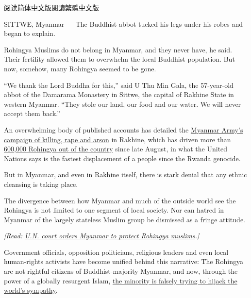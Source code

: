 \href{https://cn.nytimes3xbfgragh.onion/asia-pacific/20171025/myanmar-rohingya-ethnic-cleansing/}{阅读简体中文版}\href{https://cn.nytimes3xbfgragh.onion/asia-pacific/20171025/myanmar-rohingya-ethnic-cleansing/zh-hant/}{閱讀繁體中文版}

SITTWE, Myanmar --- The Buddhist abbot tucked his legs under his robes
and began to explain.

Rohingya Muslims do not belong in Myanmar, and they never have, he said.
Their fertility allowed them to overwhelm the local Buddhist population.
But now, somehow, many Rohingya seemed to be gone.

``We thank the Lord Buddha for this,'' said U Thu Min Gala, the
57-year-old abbot of the Damarama Monastery in Sittwe, the capital of
Rakhine State in western Myanmar. ``They stole our land, our food and
our water. We will never accept them back.''

An overwhelming body of published accounts has detailed the
\href{https://www.nytimes3xbfgragh.onion/2017/10/11/world/asia/rohingya-myanmar-atrocities.html?rref=collection\%2Ftimestopic\%2FMyanmar}{Myanmar
Army's campaign of killing, rape and arson} in Rakhine, which has driven
more than
\href{https://www.nytimes3xbfgragh.onion/2017/09/29/world/asia/rohingya-refugees-myanmar-bangladesh.html?action=click\&contentCollection=Asia\%20Pacific\&module=RelatedCoverage\&region=Marginalia\&pgtype=article}{600,000
Rohingya out of the country} since late August, in what the United
Nations says is the fastest displacement of a people since the Rwanda
genocide.

But in Myanmar, and even in Rakhine itself, there is stark denial that
any ethnic cleansing is taking place.

The divergence between how Myanmar and much of the outside world see the
Rohingya is not limited to one segment of local society. Nor can hatred
in Myanmar of the largely stateless Muslim group be dismissed as a
fringe attitude.

\emph{{[}Read:}
\emph{\href{http://www.nytimes3xbfgragh.onion/2020/01/23/world/asia/myanmar-rohingya-genocide.html}{U.N.
court orders Myanmar to protect Rohingya muslims}.{]}}

Government officials, opposition politicians, religious leaders and even
local human-rights activists have become unified behind this narrative:
The Rohingya are not rightful citizens of Buddhist-majority Myanmar, and
now, through the power of a globally resurgent Islam,
\href{https://www.nytimes3xbfgragh.onion/2017/09/18/world/asia/myanmar-rohingya-ethnic-cleansing.html}{the
minority is falsely trying to hijack the world's sympathy}.

